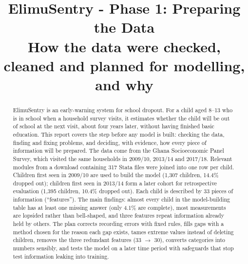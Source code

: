 \documentclass[conference,a4paper]{IEEEtran}
\begin{document}
\title{ElimuSentry - Phase 1: Preparing the Data\\
\large How the data were checked, cleaned and planned for modelling, and why}

\author{
}

\maketitle

\begin{abstract}
ElimuSentry is an early-warning system for school dropout. For a child aged 8--13 who is in school when a household survey visits, it estimates whether the child will be out of school at the next visit, about four years later, without having finished basic education. This report covers the step before any model is built: checking the data, finding and fixing problems, and deciding, with evidence, how every piece of information will be prepared. The data come from the Ghana Socioeconomic Panel Survey, which visited the same households in 2009/10, 2013/14 and 2017/18. Relevant modules from a download containing 317 Stata files were joined into one row per child. Children first seen in 2009/10 are used to build the model (1,307 children, 14.4\% dropped out); children first seen in 2013/14 form a later cohort for retrospective evaluation (1,395 children, 10.4\% dropped out). Each child is described by 33 pieces of information (``features''). The main findings: almost every child in the model-building table has at least one missing answer (only 4.1\% are complete), most measurements are lopsided rather than bell-shaped, and three features repeat information already held by others. The plan corrects recording errors with fixed rules, fills gaps with a method chosen for the reason each gap exists, tames extreme values instead of deleting children, removes the three redundant features (33 $\rightarrow$ 30), converts categories into numbers sensibly, and tests the model on a later time period with safeguards that stop test information leaking into training.
\end{abstract}
\end{document}
